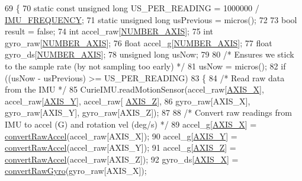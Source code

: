 \begin{DoxyCode}
69 \{
70   \textcolor{keyword}{static} \textcolor{keyword}{const} \textcolor{keywordtype}{unsigned} \textcolor{keywordtype}{long} US\_PER\_READING = 1000000 / \hyperlink{_orientation_8cpp_aacb21c2e16f8c38c985b8f02787a7baf}{IMU\_FREQUENCY};
71   \textcolor{keyword}{static} \textcolor{keywordtype}{unsigned} \textcolor{keywordtype}{long} usPrevious = micros();
72 
73   \textcolor{keywordtype}{bool} result = \textcolor{keyword}{false};
74   \textcolor{keywordtype}{int} accel\_raw[\hyperlink{_orientation_8cpp_a203c415ee0716aeaf05afca2a736a9dc}{NUMBER\_AXIS}];
75   \textcolor{keywordtype}{int} gyro\_raw[\hyperlink{_orientation_8cpp_a203c415ee0716aeaf05afca2a736a9dc}{NUMBER\_AXIS}];
76   \textcolor{keywordtype}{float} accel\_g[\hyperlink{_orientation_8cpp_a203c415ee0716aeaf05afca2a736a9dc}{NUMBER\_AXIS}];
77   \textcolor{keywordtype}{float} gyro\_ds[\hyperlink{_orientation_8cpp_a203c415ee0716aeaf05afca2a736a9dc}{NUMBER\_AXIS}];
78   \textcolor{keywordtype}{unsigned} \textcolor{keywordtype}{long} usNow;
79 
80   \textcolor{comment}{/* Ensures we stick to the sample rate (by not sampling too early) */}
81   usNow = micros();
82   \textcolor{keywordflow}{if} ((usNow - usPrevious) >= US\_PER\_READING)
83   \{
84     \textcolor{comment}{/* Read raw data from the IMU */}
85     CurieIMU.readMotionSensor(accel\_raw[\hyperlink{_orientation_8cpp_a753faa457a1c2937ea3fdcdb83c3ca5f}{AXIS\_X}], accel\_raw[\hyperlink{_orientation_8cpp_a08f3e26d90cf66bf2840d476e5d4711f}{AXIS\_Y}], accel\_raw[
      \hyperlink{_orientation_8cpp_a220ebc22eb87c8989bfd63ae3cbbe2a8}{AXIS\_Z}],
86                               gyro\_raw[AXIS\_X], gyro\_raw[AXIS\_Y], gyro\_raw[AXIS\_Z]);
87 
88     \textcolor{comment}{/* Convert raw readings from IMU to accel (G) and rotation vel (deg/s) */}
89     accel\_g[\hyperlink{_orientation_8cpp_a753faa457a1c2937ea3fdcdb83c3ca5f}{AXIS\_X}] = \hyperlink{class_orientation_ab8a6f65b7f2b43ec5dd09c47fe93fa0b}{convertRawAccel}(accel\_raw[AXIS\_X]);
90     accel\_g[\hyperlink{_orientation_8cpp_a08f3e26d90cf66bf2840d476e5d4711f}{AXIS\_Y}] = \hyperlink{class_orientation_ab8a6f65b7f2b43ec5dd09c47fe93fa0b}{convertRawAccel}(accel\_raw[AXIS\_Y]);
91     accel\_g[\hyperlink{_orientation_8cpp_a220ebc22eb87c8989bfd63ae3cbbe2a8}{AXIS\_Z}] = \hyperlink{class_orientation_ab8a6f65b7f2b43ec5dd09c47fe93fa0b}{convertRawAccel}(accel\_raw[AXIS\_Z]);
92     gyro\_ds[\hyperlink{_orientation_8cpp_a753faa457a1c2937ea3fdcdb83c3ca5f}{AXIS\_X}] = \hyperlink{class_orientation_a99bb5ed3c3226c5d636fa48f26f491dd}{convertRawGyro}(gyro\_raw[AXIS\_X]);

\end{DoxyCode}

